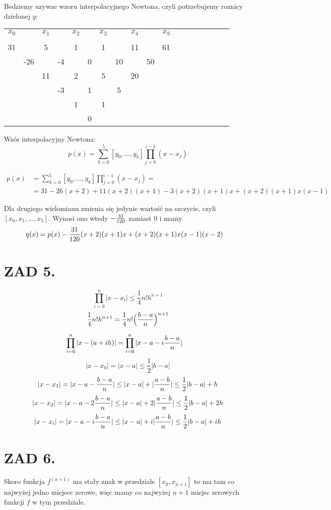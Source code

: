 \documentclass{article}[16pt]
\begin{document}
Bedziemy uzywac wzoru interpolacyjnego Newtona, czyli potrzebujemy roznicy dzielonej $y$:
\begin{center}
\begin{tabular} {c c c c c c c c c c c c c c c c c c}
    $x_0$ & & $x_1$ & & $x_2$ & & $x_3$ & & $x_4$ & & $x_5$\\
    & \\
    31 & & 5 & & 1 & & 1 & & 11 & & 61\\
    & -26 & & -4 && 0 & & 10 & & 50\\
    & & 11 & & 2 & & 5 & & 20\\
    & & & -3 & & 1 & & 5\\
    & & & & 1 & & 1\\
    & & & & & 0
\end{tabular}
\end{center}

Wzór interpolacyjny Newtona:
$$p(x)=\sum\limits_{k=0}^5[y_0,...,y_k]\prod\limits_{j=0}^{i-1}(x-x_j)$$

\begin{align*}
    p(x)&=\sum\limits_{k=0}^5[y_0,...,y_k]\prod\limits_{j=0}^{i-1}(x-x_j)=\\
    &=31 -26(x+2)+11(x+2)(x+1)-3(x+2)(x+1)x+(x+2)(x+1)x(x-1)
\end{align*}

Dla drugiego wielomianu zmienia się jedynie wartość na szczycie, czyli $[x_0,x_1,...,x_5]$. Wynosi ono wtedy $-{31\over120}$ zamiast $0$ i mamy
\begin{align*}
    q(x)&=p(x)-{31\over120}(x+2)(x+1)x+(x+2)(x+1)x(x-1)(x-2)
\end{align*}


\section*{ZAD 5.}

$$\prod\limits_{i=0}^n|x-x_i|\leq\frac14n!h^{n+1}$$
$$\frac14n!h^{n+1}=\frac14n!\Big({b-a\over n}\Big)^{n+1}$$

\begin{align*}
    \prod\limits_{i=0}^n|x-(a+ih)|&=\prod\limits_{i=0}^n|x-a-i{b-a\over n}|
\end{align*}
$$|x-x_0|=|x-a|\leq \frac12 |b-a|$$
$$|x-x_1|=|x-a-{b-a\over n}|\leq|x-a|+|{a-b\over n}|\leq \frac 12|b-a|+h$$
$$|x-x_2|=|x-a-2{b-a\over n}|\leq |x-a|+2|{a-b\over n}|\leq\frac12|b-a|+2h$$
$$|x-x_i|=|x-a-i{b-a\over n}|\leq|x-a|+i|{a-b\over n}|\leq\frac12|b-a|+ih$$


\section*{ZAD 6.}

Skoro funkcja $f^{(n+1)}$ ma stały znak w przedziale $[x_0,x_{n+1}]$ to ma tam co najwyżej jedno miejsce zerowe, więc mamy co najwyżej $n+1$ miejsc zerowych funkcji $f$ w tym przedziale.
\end{document}
